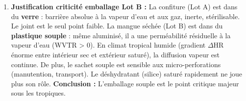 \documentclass[11pt]{article}
\begin{document}
\begin{exoresolu}
\begin{enumerate}
\begin{itemize}
    \end{itemize}
    \item \textbf{Justification criticité emballage Lot B :}
    La confiture (Lot A) est dans du \textbf{verre} : barrière absolue à la vapeur d'eau et aux gaz, inerte, stérilisable. Le joint est le seul point faible.
    La mangue séchée (Lot B) est dans du \textbf{plastique souple} : même aluminisé, il a une perméabilité résiduelle à la vapeur d'eau (WVTR > 0). En climat tropical humide (gradient $\Delta$HR énorme entre intérieur sec et extérieur saturé), la diffusion vapeur est continue. De plus, le sachet souple est sensible aux micro-perforations (manutention, transport). Le déshydratant (silice) saturé rapidement ne joue plus son rôle. \textbf{Conclusion :} L'emballage souple est le point critique majeur sous les tropiques.
\end{enumerate}
\end{exoresolu}
\end{document}
